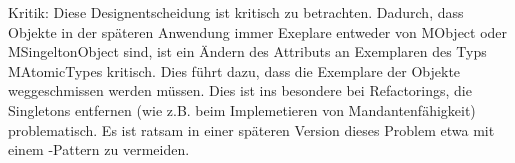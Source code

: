 Kritik:
Diese Designentscheidung ist kritisch zu betrachten. Dadurch, dass Objekte in der späteren Anwendung immer Exeplare entweder von MObject oder MSingeltonObject sind,
ist ein Ändern des Attributs  an Exemplaren des Typs MAtomicTypes kritisch. Dies führt dazu, dass die Exemplare der Objekte weggeschmissen werden müssen.
Dies ist ins besondere bei Refactorings, die Singletons entfernen (wie z.B. beim Implemetieren von Mandantenfähigkeit) problematisch.
Es ist ratsam in einer späteren Version dieses Problem etwa mit einem -Pattern zu vermeiden.